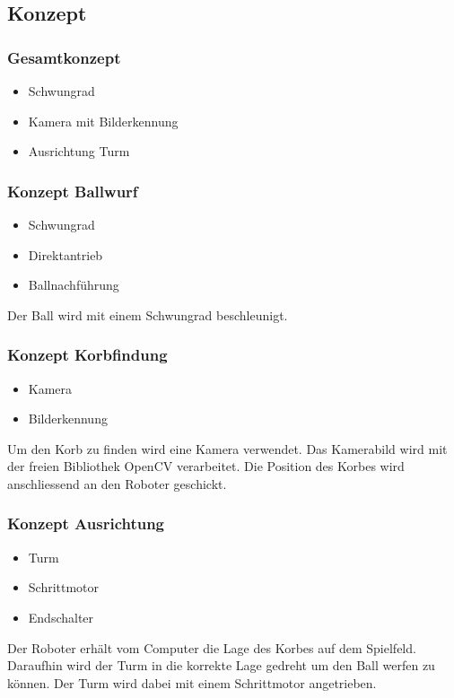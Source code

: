 \subsection{Konzept}

\subsubsection{Gesamtkonzept}
\begin{itemize}
    \item Schwungrad
    \item Kamera mit Bilderkennung
    \item Ausrichtung Turm
\end{itemize}

\subsubsection{Konzept Ballwurf}
\begin{itemize}
    \item Schwungrad
    \item Direktantrieb
    \item Ballnachführung
\end{itemize}
Der Ball wird mit einem Schwungrad beschleunigt. 

\subsubsection{Konzept Korbfindung}
\begin{itemize}
    \item Kamera
    \item Bilderkennung
\end{itemize}
Um den Korb zu finden wird eine Kamera verwendet. Das Kamerabild wird mit der 
freien Bibliothek OpenCV verarbeitet. Die Position des Korbes wird 
anschliessend an den Roboter geschickt. 

\subsubsection{Konzept Ausrichtung}
\begin{itemize}
    \item Turm
    \item Schrittmotor
    \item Endschalter
\end{itemize}
Der Roboter erhält vom Computer die Lage des Korbes auf dem Spielfeld. 
Daraufhin wird der Turm in die korrekte Lage gedreht um den Ball werfen zu 
können. Der Turm wird dabei mit einem Schrittmotor angetrieben. 

